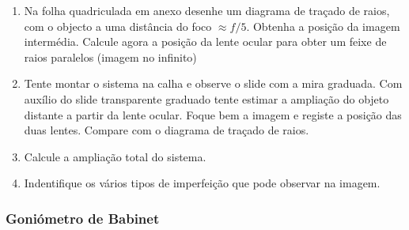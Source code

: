 \documentclass[a4paper,12pt]{article}      %
\begin{document}
\begin{enumerate}
\item Na folha quadriculada em anexo desenhe um diagrama de traçado de raios, com o objecto a uma distância do foco $\approx f/5$. Obtenha a posição da imagem intermédia. Calcule agora a posição da lente ocular para obter um feixe de raios paralelos (imagem no infinito)
\item Tente montar o sistema na calha e observe o slide com a mira graduada. Com auxílio do slide transparente graduado tente estimar a ampliação do  objeto distante a partir da lente ocular. Foque bem a imagem e registe a posição das duas lentes. Compare com o diagrama de traçado de raios.
\item Calcule a ampliação total do sistema.
\item Indentifique os vários tipos de imperfeição que pode observar na imagem. 
\end{enumerate}

\subsubsection{\sf Goniómetro de Babinet}
\end{document}
